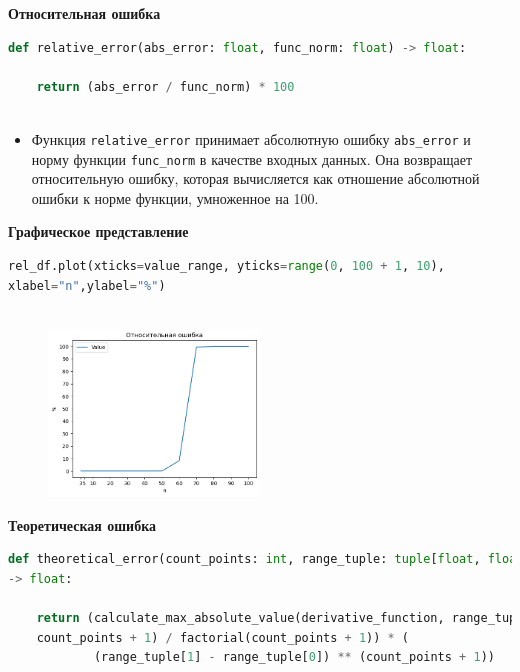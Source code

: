 \documentclass{article}
\begin{document}
\textbf{\large{Относительная ошибка}}

\begin{lstlisting}[language=Python]
def relative_error(abs_error: float, func_norm: float) -> float:

    return (abs_error / func_norm) * 100
    
\end{lstlisting}

\begin{itemize}
\item Функция \texttt{relative\_error} принимает абсолютную ошибку \texttt{abs\_error} и норму функции \texttt{func\_norm} в качестве входных данных. Она возвращает относительную ошибку, которая вычисляется как отношение абсолютной ошибки к норме функции, умноженное на 100.
\end{itemize}

\textbf{Графическое представление}

\begin{lstlisting}[language=Python]
rel_df.plot(xticks=value_range, yticks=range(0, 100 + 1, 10),
xlabel="n",ylabel="%")
    
\end{lstlisting}

\begin{figure}[h]
    \centering
    \includegraphics[width=0.5\textwidth]{output2.png}
    \label{fig:my_label}
\end{figure}


\textbf{\large{Теоретическая ошибка}}

\begin{lstlisting}[language=Python]
def theoretical_error(count_points: int, range_tuple: tuple[float, float])
-> float:
    
    return (calculate_max_absolute_value(derivative_function, range_tuple,
    count_points + 1) / factorial(count_points + 1)) * (
            (range_tuple[1] - range_tuple[0]) ** (count_points + 1))
    
\end{lstlisting}
\end{document}
